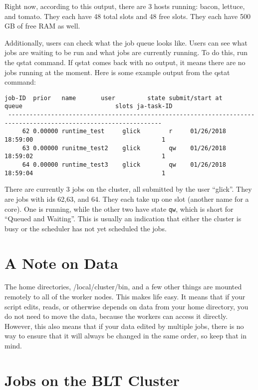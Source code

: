 \documentclass[]{book}
\theoremstyle{definition}
\theoremstyle{definition}
\theoremstyle{definition}
\theoremstyle{remark}
\begin{document}
Right now, according to this output, there are 3 hosts running: bacon,
lettuce, and tomato. They each have 48 total slots and 48 free slots.
They each have 500 GB of free RAM as well.

Additionally, users can check what the job queue looks like. Users can
see what jobs are waiting to be run and what jobs are currently running.
To do this, run the qstat command. If qstat comes back with no output,
it means there are no jobs running at the moment. Here is some example
output from the qstat command:

\begin{verbatim}
job-ID  prior   name       user         state submit/start at     queue                          slots ja-task-ID 
 -----------------------------------------------------------------------------------------------------------------
     62 0.00000 runtime_test     glick        r     01/26/2018 18:59:00                                    1        
     63 0.00000 runitme_test2    glick        qw    01/26/2018 18:59:02                                    1        
     64 0.00000 runtime_test3    glick        qw    01/26/2018 18:59:04                                    1    
\end{verbatim}

There are currently 3 jobs on the cluster, all submitted by the user
``glick''. They are jobs with ids 62,63, and 64. They each take up one
slot (another name for a core). One is running, while the other two have
state \texttt{qw}, which is short for ``Queued and Waiting''. This is
usually an indication that either the cluster is busy or the scheduler
has not yet scheduled the jobs.

\section{A Note on Data}\label{a-note-on-data}

The home directories, /local/cluster/bin, and a few other things are
mounted remotely to all of the worker nodes. This makes life easy. It
means that if your script edits, reads, or otherwise depends on data
from your home directory, you do not need to move the data, because the
workers can access it directly. However, this also means that if your
data edited by multiple jobs, there is no way to ensure that it will
always be changed in the same order, so keep that in mind.

\section{Jobs on the BLT Cluster}\label{jobs-on-the-blt-cluster}
\end{document}
